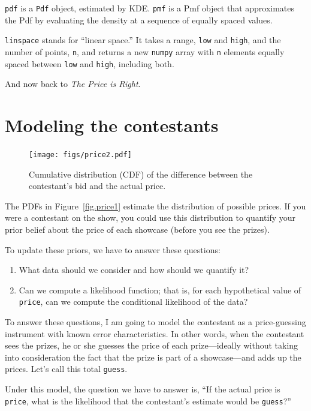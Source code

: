 \documentclass[12pt]{book}
\theoremstyle{exercise}
\begin{document}
{\tt pdf} is a {\tt Pdf} object, estimated by KDE.  {\tt pmf}
is a Pmf object that approximates the Pdf by evaluating the density
at a sequence of equally spaced values.

{\tt linspace} stands for
``linear space.''  It takes a range, {\tt low} and {\tt high}, and
the number of points, {\tt n}, and returns a new {\tt numpy}
array with {\tt n} elements equally spaced between {\tt low} and
{\tt high}, including both.

And now back to {\it The Price is Right}.


\section{Modeling the contestants}

\begin{figure}
\centerline{\texttt{[image: figs/price2.pdf]}}
\caption{Cumulative distribution (CDF) of the difference between the
  contestant's bid and the actual price.}
\label{fig.price2}
\end{figure}

The PDFs in Figure~\ref{fig.price1} estimate the distribution of
possible prices.  If you were a contestant on the
show, you could use this distribution to quantify your prior belief
about the price of each showcase (before you see the prizes).

To update these priors, we have to answer these questions:

\begin{enumerate}

\item What data should we consider and how should we quantify it?

\item Can we compute a likelihood function; that is,
  for each hypothetical value of {\tt price}, can we compute
  the conditional likelihood of the data?

\end{enumerate}

To answer these questions, I am going to model the contestant
as a price-guessing instrument with known error characteristics.
In other words, when the contestant sees the prizes, he or she
guesses the price of each prize---ideally without taking into
consideration the fact that the prize is part of a showcase---and
adds up the prices.  Let's call this total {\tt guess}.

Under this model, the question we have to answer is, ``If the
actual price is {\tt price}, what is the likelihood that the
contestant's estimate would be {\tt guess}?''
\end{document}
